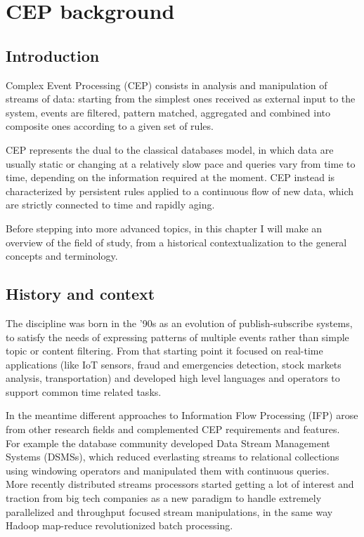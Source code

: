\chapter{CEP background}

\section{Introduction}
Complex Event Processing (CEP) consists in analysis and manipulation of streams of data: starting from the simplest ones received as external input to the system, events are filtered, pattern matched, aggregated and combined into composite ones according to a given set of rules.

CEP represents the dual to the classical databases model, in which data are usually static or changing at a relatively slow pace and queries vary from time to time, depending on the information required at the moment. CEP instead is characterized by persistent rules applied to a continuous flow of new data, which are strictly connected to time and rapidly aging.

Before stepping into more advanced topics, in this chapter I will make an overview of the field of study, from a historical contextualization to the general concepts and terminology.

\section{History and context}
The discipline was born in the '90s as an evolution of publish-subscribe systems, to satisfy the needs of expressing patterns of multiple events rather than simple topic or content filtering. From that starting point it focused on real-time applications (like IoT sensors, fraud and emergencies detection, stock markets analysis, transportation) and developed high level languages and operators to support common time related tasks.


In the meantime different approaches to Information Flow Processing (IFP) \cite{survey} arose from other research fields and complemented CEP requirements and features.\\
For example the database community developed Data Stream Management Systems (DSMSs), which reduced everlasting streams to relational collections using windowing operators and manipulated them with continuous queries.\\
More recently distributed streams processors started getting a lot of interest and traction from big tech companies as a new paradigm to handle extremely parallelized and throughput focused stream manipulations, in the same way Hadoop map-reduce revolutionized batch processing.

